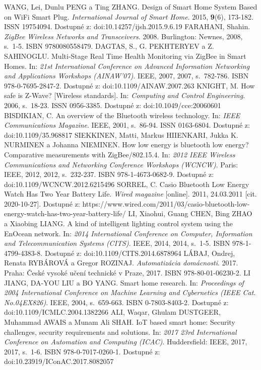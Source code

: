 \documentclass[twoside]{ctuthesis}
\theoremstyle{plain}
\theoremstyle{definition}
\theoremstyle{note}
\begin{document}
\begin{thebibliography}{46}
 WANG, Lei, Dunlu PENG a Ting ZHANG. Design of Smart Home System Based on WiFi Smart Plug. \textit{International Journal of Smart Home}. 2015, \textbf{9}(6), 173-182. ISSN 19754094. Dostupné z: doi:10.14257/ijsh.2015.9.6.19
  FARAHANI, Shahin. \textit{ZigBee Wireless Networks and Transceivers}. 2008. Burlington: Newnes, 2008, s.~1-5. ISBN 9780080558479.
 DAGTAS, S., G. PEKHTERYEV a Z. SAHINOGLU. Multi-Stage Real Time Health Monitoring via ZigBee in Smart Homes. In: \textit{21st International Conference on Advanced Information Networking and Applications Workshops (AINAW'07)}. IEEE, 2007, 2007, s.~782-786. ISBN 978-0-7695-2847-2. Dostupné z: doi:10.1109/AINAW.2007.263
 KNIGHT, M. How safe is Z-Wave? [Wireless standards]. In: \textit{Computing and Control Engineering}. 2006, s.~18-23. ISSN 0956-3385. Dostupné z: doi:10.1049/cce:20060601
BISDIKIAN, C. An overview of the Bluetooth wireless technology. In: \textit{IEEE Communications Magazine}. IEEE, 2001, s.~86-94. ISSN 0163-6804. Dostupné z: doi:10.1109/35.968817
 SIEKKINEN, Matti, Markus HIIENKARI, Jukka K. NURMINEN a Johanna NIEMINEN. How low energy is bluetooth low energy? Comparative measurements with ZigBee/802.15.4. In: \textit{2012 IEEE Wireless Communications and Networking Conference Workshops (WCNCW)}. Paris: IEEE, 2012, 2012, s.~232-237. ISBN 978-1-4673-0682-9. Dostupné z: doi:10.1109/WCNCW.2012.6215496
SORREL, C. Casio Bluetooth Low Energy Watch Has Two Year Battery Life. \textit{Wired magazine} [online]. 2011, 24.03.2011 [cit. 2020-10-27]. Dostupné z: https://www.wired.com/2011/03/casio-bluetooth-low-energy-watch-has-two-year-battery-life/
LI, Xiaohui, Guang CHEN, Bing ZHAO a Xiaobing LIANG. A kind of intelligent lighting control system using the EnOcean network. In: \textit{2014 International Conference on Computer, Information and Telecommunication Systems (CITS)}. IEEE, 2014, 2014, s.~1-5. ISBN 978-1-4799-4383-8. Dostupné z: doi:10.1109/CITS.2014.6878964
LÁBAJ, Ondrej, Renata RYBÁROVÁ a Gregor ROZINAJ. \textit{Automatizácia domácnosti}. 2017. Praha: České vysoké učení technické v Praze, 2017. ISBN 978-80-01-06230-2.
  LI JIANG, DA-YOU LIU a BO YANG. Smart home research. In: \textit{Proceedings of 2004 International Conference on Machine Learning and Cybernetics (IEEE Cat. No.04EX826)}. IEEE, 2004, s.~659-663. ISBN 0-7803-8403-2. Dostupné z: doi:10.1109/ICMLC.2004.1382266
 ALI, Waqar, Ghulam DUSTGEER, Muhammad AWAIS a Munam Ali SHAH. IoT based smart home: Security challenges, security requirements and solutions. In: \textit{2017 23rd International Conference on Automation and Computing (ICAC)}. Huddersfield: IEEE, 2017, 2017, s.~1-6. ISBN 978-0-7017-0260-1. Dostupné z: doi:10.23919/IConAC.2017.8082057

\end{thebibliography}
\end{document}
